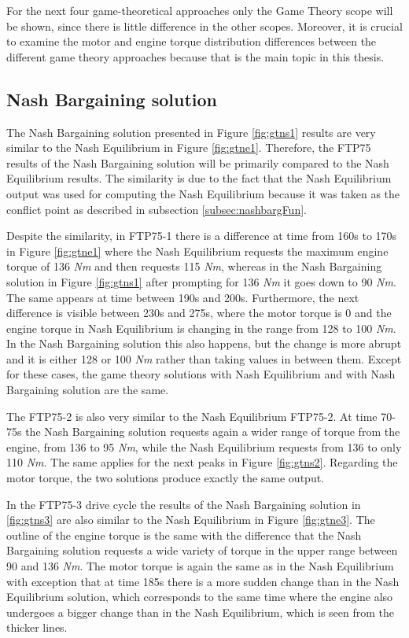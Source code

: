 For the next four game-theoretical approaches only the Game Theory scope will be shown, since there is little difference in the other scopes. Moreover, it is crucial to examine the motor and engine torque distribution differences between the different game theory approaches because that is the main topic in this thesis.

\subsection{Nash Bargaining solution}
The Nash Bargaining solution presented in Figure \ref{fig:gtns1} results are very similar to the Nash Equilibrium in Figure \ref{fig:gtne1}. Therefore, the FTP75 results of the Nash Bargaining solution will be primarily compared to the Nash Equilibrium results. The similarity is due to the fact that the Nash Equilibrium output was used for computing the Nash Equilibrium because it was taken as the conflict point as described in subsection \ref{subsec:nashbargFun}.

Despite the similarity, in FTP75-1 there is a difference at time from 160s to 170s in Figure \ref{fig:gtne1} where the Nash Equilibrium requests the maximum engine torque of 136 \textit{Nm} and then requests 115 \textit{Nm}, whereas in the Nash Bargaining solution in Figure \ref{fig:gtns1} after prompting for 136 \textit{Nm} it goes down to 90 \textit{Nm}. The same appears at time between 190s and 200s. Furthermore, the next difference is visible between 230s and 275s, where the motor torque is 0 and the engine torque in Nash Equilibrium is changing in the range from 128 to 100 \textit{Nm}. In the Nash Bargaining solution this also happens, but the change is more abrupt and it is either 128 or 100 \textit{Nm} rather than taking values in between them. Except for these cases, the game theory solutions with Nash Equilibrium and with Nash Bargaining solution are the same.

The FTP75-2 is also very similar to the Nash Equilibrium FTP75-2. At time 70-75s the Nash Bargaining solution requests again a wider range of torque from the engine, from 136 to 95 \textit{Nm}, while the Nash Equilibrium requests from 136 to only 110 \textit{Nm}. The same applies for the next peaks in Figure \ref{fig:gtns2}. Regarding the motor torque, the two solutions produce exactly the same output.

In the FTP75-3 drive cycle the results of the Nash Bargaining solution in \ref{fig:gtns3} are also similar to the Nash Equilibrium in Figure \ref{fig:gtne3}. The outline of the engine torque is the same with the difference that the Nash Bargaining solution requests a wide variety of torque in the upper range between 90 and 136 \textit{Nm}. The motor torque is again the same as in the Nash Equilibrium with exception that at time 185s there is a more sudden change than in the Nash Equilibrium solution, which corresponds  to the same time where the engine also undergoes a bigger change than in the Nash Equilibrium, which is seen from the thicker lines.

